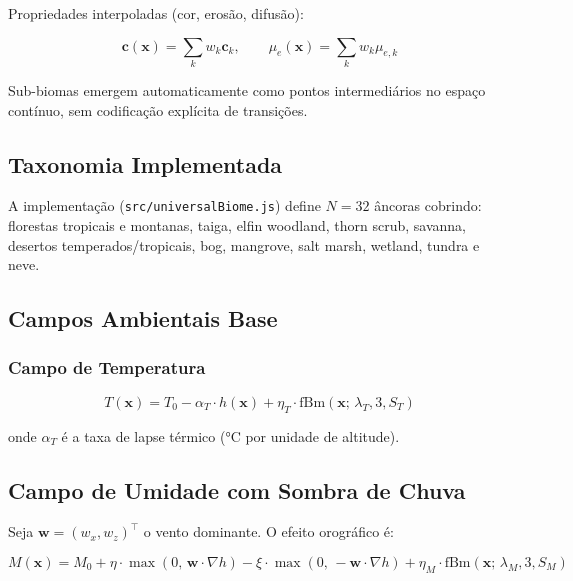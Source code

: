 \documentclass[11pt,a4paper]{article}
\begin{document}
Propriedades interpoladas (cor, erosão, difusão):

\begin{equation}
  \mathbf{c}(\mathbf{x}) = \sum_k w_k \mathbf{c}_k, \qquad
  \mu_e(\mathbf{x}) = \sum_k w_k \mu_{e,k}
  \label{eq:biome-interp}
\end{equation}

Sub-biomas emergem automaticamente como pontos intermediários no espaço contínuo,
sem codificação explícita de transições.

\subsection{Taxonomia Implementada}

A implementação (\texttt{src/universalBiome.js}) define $N = 32$ âncoras cobrindo:
florestas tropicais e montanas, taiga, elfin woodland, thorn scrub, savanna,
desertos temperados/tropicais, bog, mangrove, salt marsh, wetland, tundra e neve.

\subsection{Campos Ambientais Base}

\subsubsection{Campo de Temperatura}

\begin{equation}
  T(\mathbf{x}) = T_0 - \alpha_T \cdot h(\mathbf{x})
  + \eta_T \cdot \text{fBm}(\mathbf{x};\, \lambda_T, 3, S_T)
  \label{eq:temperature}
\end{equation}

onde $\alpha_T$ é a taxa de lapse térmico (°C por unidade de altitude).

\subsection{Campo de Umidade com Sombra de Chuva}

Seja $\mathbf{w} = (w_x, w_z)^\top$ o vento dominante. O efeito orográfico é:

\begin{equation}
  M(\mathbf{x}) = M_0
  + \eta \cdot \max(0,\, \mathbf{w} \cdot \nabla h)
  - \xi \cdot \max(0,\, -\mathbf{w} \cdot \nabla h)
  + \eta_M \cdot \text{fBm}(\mathbf{x};\, \lambda_M, 3, S_M)
  \label{eq:moisture}
\end{equation}
\end{document}

